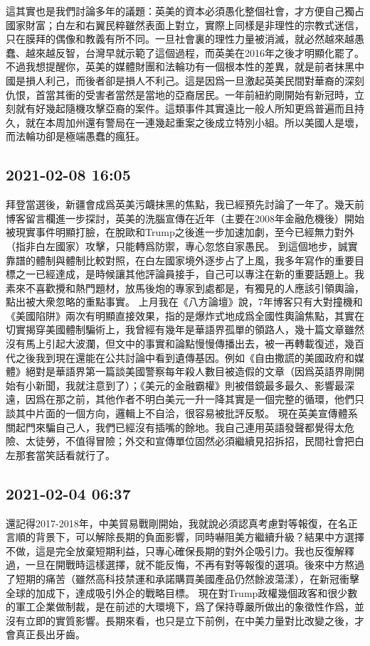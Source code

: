\documentclass[twocolumn]{ctexart}
\begin{document}
這其實也是我們討論多年的議題：英美的資本必須愚化整個社會，才方便自己獨占國家財富；白左和右翼民粹雖然表面上對立，實際上同樣是非理性的宗教式迷信，只在膜拜的偶像和教義有所不同。一旦社會裏的理性力量被消滅，就必然越來越愚蠢、越來越反智，台灣早就示範了這個過程，而英美在2016年之後才明顯化罷了。
不過我想提醒你，英美的媒體財團和法輪功有一個根本性的差異，就是前者抹黑中國是損人利己，而後者卻是損人不利己。這是因爲一旦激起英美民間對華裔的深刻仇恨，首當其衝的受害者當然是當地的亞裔居民。一年前紐約剛開始有新冠時，立刻就有好幾起隨機攻擊亞裔的案件。這類事件其實遠比一般人所知更爲普遍而且持久，就在本周加州還有警局在一連幾起重案之後成立特別小組。所以美國人是壞，而法輪功卻是極端愚蠢的瘋狂。
\subsection*{2021-02-08 16:05}

拜登當選後，新疆會成爲英美污衊抹黑的焦點，我已經預先討論了一年了。幾天前博客留言欄進一步探討，英美的洗腦宣傳在近年（主要在2008年金融危機後）開始被現實事件明顯打臉，在脫歐和Trump之後進一步加速加劇，至今已經無力對外（指非白左國家）攻擊，只能轉爲防禦，專心忽悠自家愚民。
到這個地步，誠實靠譜的體制與體制比較對照，在白左國家境外逐步占了上風，我多年寫作的重要目標之一已經達成，是時候讓其他評論員接手，自己可以專注在新的重要話題上。我素來不喜歡攪和熱門題材，放馬後炮的專家到處都是，有獨見的人應該引領輿論，點出被大衆忽略的重點事實。
上月我在《八方論壇》說，7年博客只有大對撞機和《美國陷阱》兩次有明顯直接效果，指的是爆炸式地成爲全國性輿論焦點，其實在切實揭穿美國體制騙術上，我曾經有幾年是華語界孤單的領路人，幾十篇文章雖然沒有馬上引起大波瀾，但文中的事實和論點慢慢傳播出去，被一再轉載復述，幾百代之後我到現在還能在公共討論中看到遺傳基因。例如《自由撒謊的美國政府和媒體》絕對是華語界第一篇談美國警察每年殺人數目被造假的文章（因爲英語界剛開始有小新聞，我就注意到了）；《美元的金融霸權》則被借鏡最多最久、影響最深遠，因爲在那之前，其他作者不明白美元一升一降其實是一個完整的循環，他們只談其中片面的一個方向，邏輯上不自洽，很容易被批評反駁。
現在英美宣傳體系關起門來騙自己人，我們已經沒有插嘴的餘地。我自己連用英語發聲都覺得太危險、太徒勞，不值得冒險；外交和宣傳單位固然必須繼續見招拆招，民間社會把白左那套當笑話看就行了。
\subsection*{2021-02-04 06:37}

還記得2017-2018年，中美貿易戰剛開始，我就說必須認真考慮對等報復，在名正言順的背景下，可以解除長期的負面影響，同時嚇阻美方繼續升級？結果中方選擇不做，這是完全放棄短期利益，只專心確保長期的對外企吸引力。我也反復解釋過，一旦在開戰時這樣選擇，就不能反悔，不再有對等報復的選項。後來中方熬過了短期的痛苦（雖然高科技禁運和承諾購買美國產品仍然餘波蕩漾），在新冠衝擊全球的加成下，達成吸引外企的戰略目標。
現在對Trump政權幾個政客和很少數的軍工企業做制裁，是在前述的大環境下，爲了保持尊嚴所做出的象徵性作爲，並沒有立即的實質影響。長期來看，也只是立下前例，在中美力量對比改變之後，才會真正長出牙齒。
\end{document}
